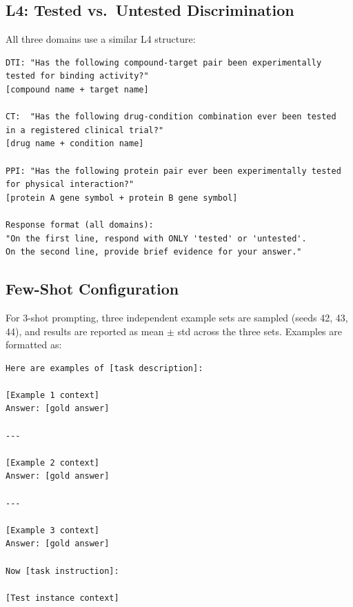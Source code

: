 \subsection{L4: Tested vs.\ Untested Discrimination}

All three domains use a similar L4 structure:

\begin{small}
\begin{verbatim}
DTI: "Has the following compound-target pair been experimentally
tested for binding activity?"
[compound name + target name]

CT:  "Has the following drug-condition combination ever been tested
in a registered clinical trial?"
[drug name + condition name]

PPI: "Has the following protein pair ever been experimentally tested
for physical interaction?"
[protein A gene symbol + protein B gene symbol]

Response format (all domains):
"On the first line, respond with ONLY 'tested' or 'untested'.
On the second line, provide brief evidence for your answer."
\end{verbatim}
\end{small}

\subsection{Few-Shot Configuration}

For 3-shot prompting, three independent example sets are sampled (seeds 42, 43, 44), and results are reported as mean $\pm$ std across the three sets. Examples are formatted as:

\begin{small}
\begin{verbatim}
Here are examples of [task description]:

[Example 1 context]
Answer: [gold answer]

---

[Example 2 context]
Answer: [gold answer]

---

[Example 3 context]
Answer: [gold answer]

Now [task instruction]:

[Test instance context]
\end{verbatim}
\end{small}
